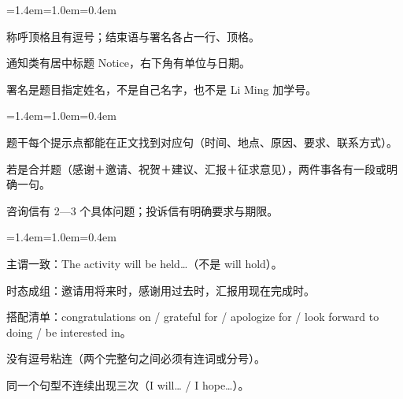 \documentclass[10pt,a4paper]{ctexart}
\begin{document}
\begin{list}{}{\leftmargin=1.4em=1.0em=0.4em\itemindent=0pt\topsep=0pt\parsep=2pt\itemsep=2pt}
\item[$\square$]{\footnotesize 称呼顶格且有逗号；结束语与署名各占一行、顶格。}
\item[$\square$]{\footnotesize 通知类有居中标题 Notice，右下角有单位与日期。}
\item[$\square$]{\footnotesize 署名是题目指定姓名，不是自己名字，也不是 Li Ming 加学号。}
\end{list}\vspace{4pt}
\par\vspace{1pt}
\begin{list}{}{\leftmargin=1.4em=1.0em=0.4em\itemindent=0pt\topsep=0pt\parsep=2pt\itemsep=2pt}
\item[$\square$]{\footnotesize 题干每个提示点都能在正文找到对应句（时间、地点、原因、要求、联系方式）。}
\item[$\square$]{\footnotesize 若是合并题（感谢＋邀请、祝贺＋建议、汇报＋征求意见），两件事各有一段或明确一句。}
\item[$\square$]{\footnotesize 咨询信有 2—3 个具体问题；投诉信有明确要求与期限。}
\end{list}\vspace{4pt}
\par\vspace{1pt}
\begin{list}{}{\leftmargin=1.4em=1.0em=0.4em\itemindent=0pt\topsep=0pt\parsep=2pt\itemsep=2pt}
\item[$\square$]{\footnotesize 主谓一致：The activity will be held…（不是 will hold）。}
\item[$\square$]{\footnotesize 时态成组：邀请用将来时，感谢用过去时，汇报用现在完成时。}
\item[$\square$]{\footnotesize 搭配清单：congratulations on / grateful for / apologize for / look forward to doing / be interested in。}
\item[$\square$]{\footnotesize 没有逗号粘连（两个完整句之间必须有连词或分号）。}
\item[$\square$]{\footnotesize 同一个句型不连续出现三次（I will… / I hope…）。}
\end{list}\vspace{4pt}
\par\vspace{1pt}
\end{document}
